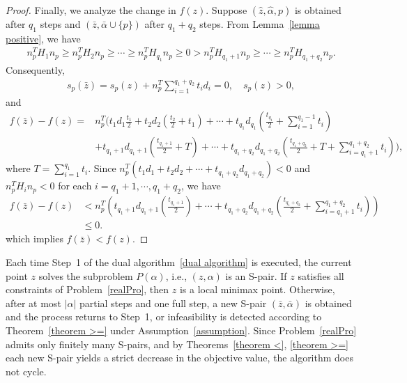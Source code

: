 \documentclass{article}
\begin{document}
\begin{proof}
		Finally, we analyze the change in $f(z)$. 
		Suppose $(\hat{z}, \hat{\alpha}, p)$ is obtained after $q_{1}$ steps and $(\bar{z}, \bar{\alpha}\cup\{p\})$ after $q_{1}+q_{2}$ steps. 
		From Lemma~\ref{lemma positive}, we have
		\begin{align*}
		n_{p}^{T}H_{1}n_{p} \ge n_{p}^{T}H_{2}n_{p} \ge \cdots \ge n_{p}^{T}H_{q_{1}}n_{p} \ge 0 > n_{p}^{T}H_{q_{1}+1}n_{p} \ge \cdots \ge n_{p}^{T}H_{q_{1}+q_{2}}n_{p}.
		\end{align*}
		Consequently,
		\begin{align*}
		s_{p}(\bar{z}) = s_{p}(z) + n_{p}^{T}\sum_{i=1}^{q_{1}+q_{2}} t_{i}d_{i} = 0,
		\quad s_{p}(z) > 0,
		\end{align*}
		and
		\begin{align*}
			f(\bar{z}) - f(z) = & n_{p}^{T}\big(t_{1}d_{1}\frac{t_{1}}{2} + t_{2}d_{2}(\frac{t_{2}}{2} + t_{1}) + \cdots + t_{q_{1}}d_{q_{1}}(\frac{t_{q_{1}}}{2} + \sum_{i = 1}^{q_{1} - 1}t_{i}) \\
			& + t_{q_{1} + 1}d_{q_{1} + 1}(\frac{t_{q_{1} + 1}}{2} + T) + \cdots + t_{q_{1} + q_{2}}d_{q_{1} + q_{2}}(\frac{t_{q_{1} + q_{2}}}{2} + T + \sum_{i = q_{1} + 1}^{q_{1} + q_{2}} t_{i})\big),			
		\end{align*}
		where $T = \sum_{i = 1}^{q_{1}}t_{i}$. Since $n_{p}^{T}(t_{1}d_{1} + t_{2}d_{2} + \cdots + t_{q_{1} + q_{2}}d_{q_{1} + q_{2}}) < 0$ and $n_{p}^{T}H_{i}n_{p} < 0$ for each $i = q_{1} + 1, \cdots, q_{1} + q_{2}$, we have
		\begin{align*}
			f(\bar{z}) - f(z) & < n_{p}^{T}\left(t_{q_{1} + 1}d_{q_{1} + 1}(\frac{t_{q_{1} + 1}}{2}) + \cdots + t_{q_{1} + q_{2}}d_{q_{1} + q_{2}}(\frac{t_{q_{1} + q_{2}}}{2} + \sum_{i = q_{1} + 1}^{q_{1} + q_{2}} t_{i})\right)\\
			& \leq 0.
		\end{align*}
		which implies $f(\bar{z}) < f(z)$.
	\end{proof}

	Each time Step~1 of the dual algorithm~\ref{dual algorithm} is executed, the current point $z$ solves the subproblem $P(\alpha)$, i.e., $(z, \alpha)$ is an S-pair. 
	If $z$ satisfies all constraints of Problem~\eqref{realPro}, then $z$ is a local minimax point. 
	Otherwise, after at most $|\alpha|$ partial steps and one full step, a new S-pair $(\bar{z}, \bar{\alpha})$ is obtained and the process returns to Step~1, or infeasibility is detected according to Theorem~\ref{theorem >=} under Assumption~\ref{assumption}. 
	Since Problem~\eqref{realPro} admits only finitely many S-pairs, and by Theorems~\ref{theorem <}, \ref{theorem >=} each new S-pair yields a strict decrease in the objective value, the algorithm does not cycle.
	
\end{document}
